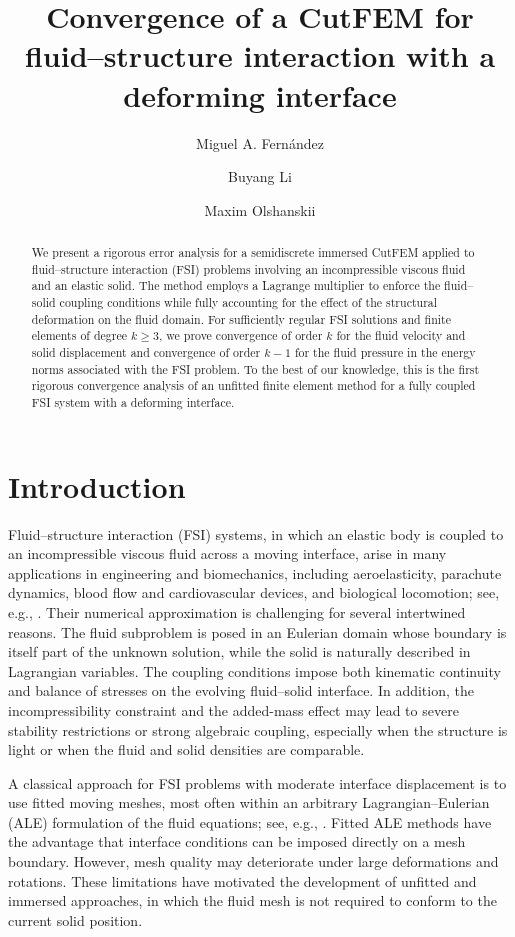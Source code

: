 \documentclass[11pt,reqno]{amsart}
\title[]{Convergence of a C\MakeLowercase{ut}FEM for fluid--structure interaction with a deforming interface
}
\author[M.A. Fernández]{Miguel A. Fernández}
\author[B. Li]{Buyang Li}
\author[M. Olshanskii]{Maxim Olshanskii}
\theoremstyle{definition}
\theoremstyle{plain}
\numberwithin{theorem}{section}
\numberwithin{proposition}{section}
\numberwithin{lemma}{section}
\numberwithin{equation}{section}
\renewcommand{\(}{\bigl(}
\renewcommand{\)}{\bigr)}
\begin{document}
\maketitle

\begin{abstract}
We present a rigorous error analysis for a semidiscrete immersed
CutFEM applied to fluid--structure interaction (FSI) problems involving an incompressible viscous fluid and an elastic solid. The method employs a Lagrange multiplier to enforce the fluid--solid coupling conditions while fully accounting for the effect of the structural deformation on the fluid domain. For sufficiently regular FSI solutions and finite elements of degree $k\geq3$, we prove convergence of order $k$ for the fluid velocity and solid displacement and convergence of order $k-1$ for the fluid pressure in the energy norms associated with the FSI problem. To the best of our knowledge, this is the first rigorous convergence analysis of an unfitted finite element method for a fully coupled FSI system with a deforming interface. 
\end{abstract}

\tableofcontents 

\section{Introduction}

Fluid--structure interaction (FSI) systems, in which an elastic body is coupled to an
incompressible viscous fluid across a moving interface, arise in many applications in
engineering and biomechanics, including aeroelasticity, parachute dynamics, blood flow
and cardiovascular devices, and biological locomotion; see, e.g.,
\cite{letallec-mouro-01,takizawa-tezduyar-12,Bazilevs2013,kamensky2015immersogeometric,mullert-et-al-10,tian-et-al-14,bergmann-et-al-22}.
Their numerical approximation is challenging for several intertwined reasons. The fluid
subproblem is posed in an Eulerian domain whose boundary is itself part of the unknown
solution, while the solid is naturally described in Lagrangian variables. The coupling
conditions impose both kinematic continuity and balance of stresses on the evolving
fluid--solid interface. In addition, the incompressibility constraint and the added-mass
effect may lead to severe stability restrictions or strong algebraic coupling, especially
when the structure is light or when the fluid and solid densities are comparable.

A classical approach for FSI problems with moderate interface displacement is to use
fitted moving meshes, most often within an arbitrary Lagrangian--Eulerian (ALE)
formulation of the fluid equations; see, e.g.,
\cite{donea1982arbitrary,nomura-hughes-92,stein2003,takizawa2012space,landajuela2017coupling}.
Fitted ALE methods have the advantage that interface conditions can be imposed directly
on a mesh boundary. However, mesh quality may deteriorate under large deformations and rotations. These limitations have motivated the
development of unfitted and immersed approaches, in which the fluid mesh is not required
to conform to the current solid position.
\end{document}
